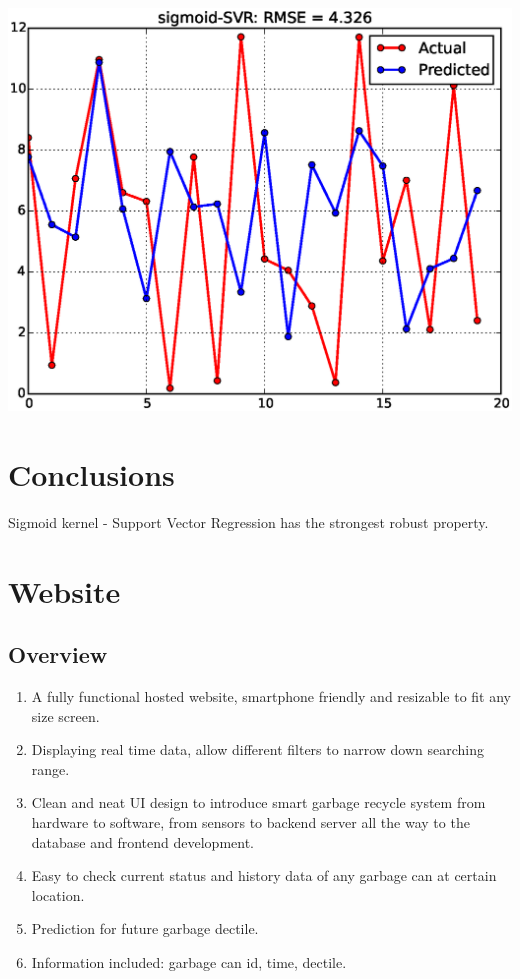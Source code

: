 \documentclass[a0,portrait]{a0poster}
\begin{document}
\begin{multicols}{3}
\begin{center}
\includegraphics[width=\linewidth]{sigmoid-SVR.eps}
\end{center}

\color{SaddleBrown} %

\section*{Conclusions}
Sigmoid kernel - Support Vector Regression has the strongest robust property.

\color{black}
\section*{Website}
\subsection*{Overview}
\begin{enumerate}
\item A fully functional hosted website, smartphone friendly and resizable to fit any size screen.
\item Displaying real time data, allow different filters to narrow down searching range.
\item Clean and neat UI design to introduce smart garbage recycle system from hardware to software, from sensors to backend server all the way to the database and frontend development.
\item Easy to check current status and history data of any garbage can at certain location.
\item Prediction for future garbage dectile.
\item  Information included: garbage can id, time, dectile.
\end{enumerate}

\end{multicols}
\end{document}
